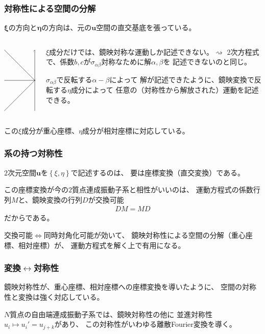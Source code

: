\documentclass[12pt, t]{beamer}
\newcommand{\clr}[1]{\left\{{}#1\right\}{}}
\begin{document}
\begin{frame}
\frametitle{対称性による空間の分解}
$\bm{\xi}$の方向と$\bm{\eta}$の方向は、元の$\bm{u}$空間の直交基底を張っている。

\begin{columns}
\begin{column}{0.4\textwidth}
\[
\begin{tikzpicture}
\draw[->] (-1.5,0) -- (1.5, 0);
\draw[->] (0,-1.5)-- (0,1.5);
\draw(1.4, 0) node[below]{$u_1$};
\draw(0, 1.4) node[right]{$u_2$};
\draw[->] (-1.5, -1.5) -- (1.5, 1.5);
\draw[->] (-1.5, 1.5) -- (1.5, -1.5);
\draw(1.3, 1.3) node[below]{$\eta$};
\draw(1.3, -1.3) node[above]{$\xi$};
\end{tikzpicture}
\]
\end{column}
\begin{column}{0.6\textwidth}
$\xi$成分だけでは、鏡映対称な運動しか記述できない。$\rightsquigarrow$
$2$次方程式で、係数$b,c$が$\sigma_{\alpha \beta}$対称なために解$\alpha,\beta$を
記述できないのと同じ。

$\sigma_{\alpha \beta}$で反転する$\alpha - \beta$によって
解が記述できたように、鏡映変換で反転する$\eta$成分によって
任意の（対称性から解放された）運動を記述できる。
\end{column}
\end{columns}
この$\xi$成分が重心座標、$\eta$成分が相対座標に対応している。
\end{frame}

\begin{frame}
\frametitle{系の持つ対称性}
$2$次元空間$\bm{u}$を$\clr{\xi, \eta}$で記述するのは、
要は座標変換（直交変換）である。

この座標変換が今の$2$質点連成振動子系と相性がいいのは、
運動方程式の係数行列$M$と、鏡映変換の行列$D$が交換可能
\begin{align}
D M = M D
\end{align}
だからである。

交換可能$\Leftrightarrow$同時対角化可能が効いて、
鏡映対称性による空間の分解（重心座標、相対座標）が、
運動方程式を解く上で有用になる。
\end{frame}

\begin{frame}
\frametitle{変換$\leftrightarrow$対称性}
鏡映対称性が、重心座標、相対座標への座標変換を導いたように、
空間の対称性と変換は強く対応している。

$N$質点の自由端連成振動子系では、鏡映対称性の他に
並進対称性$u_i \mapsto u_i' = u_{j+k}$があり、
この対称性がいわゆる離散Fourier変換を導く。
\end{frame}
\end{document}
